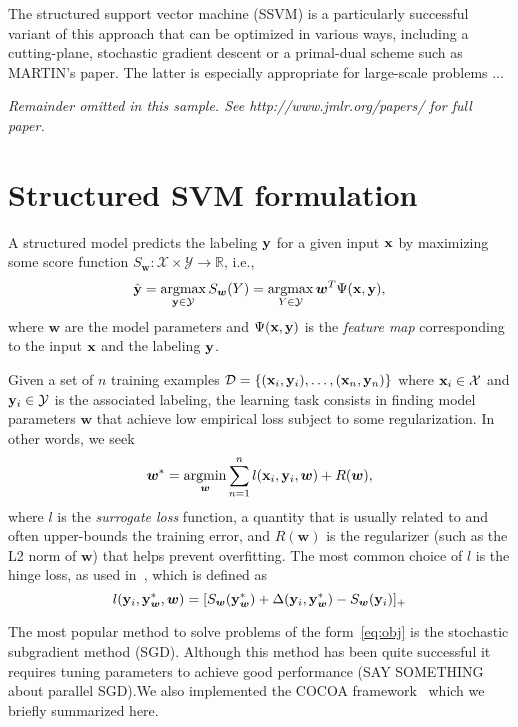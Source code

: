 \documentclass[twoside,11pt]{article}
\newcommand{\dataset}{{\cal D}}
\newcommand{\xv}{{\bf x}}
\newcommand{\yv}{{\bf y}}
\newcommand{\argmax}{\operatornamewithlimits{argmax}}
\newcommand{\argmin}{\operatornamewithlimits{argmin}}
\newcommand{\0}{\mathbf{0}} %
\newcommand{\weight}{w}
\newcommand{\wv}{{\bm{\weight}}}
\begin{document}
The structured support vector machine (SSVM) is a particularly successful variant of this approach that can be optimized in various ways, including a cutting-plane, stochastic gradient descent or a primal-dual scheme such as MARTIN's paper. The latter is especially appropriate for large-scale problems ...

{\noindent \em Remainder omitted in this sample. See http://www.jmlr.org/papers/ for full paper.}

\section{Structured SVM formulation}

A structured model predicts the labeling $\yv$ for a given input $\xv$ by maximizing some score function
$S_\wv:\mathcal{X} \times \mathcal{Y} \rightarrow \mathbb{R}$,
i.e.,
%
\begin{equation}
\label{eq:inference}
\hat{\yv} = \argmax_{\yv \in \mathcal{Y}} S_\wv(Y) = \argmax_{Y \in \mathcal{Y}} \wv^T\Psi(\xv,\yv),
\end{equation}
%
where $\wv$ are the model parameters and $\Psi(\xv,\yv)$ is the \emph{feature map} corresponding to the input $\xv$ and the labeling $\yv$.


Given a set of $n$ training examples $\dataset=\{(\xv_i,\yv_i), \dots, (\xv_n, \yv_n)\}$ where $\xv_i \in \mathcal{X}$ and $\yv_i \in \mathcal{Y}$ is the associated labeling, 
the learning task consists in finding model parameters $\wv$ that achieve low empirical loss subject to some regularization. In other words, we seek
%
\begin{align}
\label{eq:obj}
\wv^* = \argmin_{\wv} \sum_{n=1}^n l(\xv_i, \yv_i, \wv) + R(\wv),
\end{align}
%
where $l$ is the \emph{surrogate loss} function,
a quantity that is usually related to and often upper-bounds the training error, 
and $R(\wv)$ is the regularizer (such as the L2 norm of $\wv$)
that helps prevent overfitting. 
The most common choice of $l$ is the hinge loss, as used in~\cite{Taskar:2003tt,Tsochantaridis:2005ww}, which is defined as
\begin{equation}
\label{eq:hinge-loss}
l(\yv_i, \yv^*_\wv, \wv) = [S_\wv(\yv^*_\wv) + \Delta(\yv_i, \yv^*_\wv) - S_\wv(\yv_i)]_+
\end{equation}


The most popular method to solve problems of the form~\eqref{eq:obj}
is the stochastic subgradient method (SGD). Although this method has
been quite successful it requires tuning parameters to achieve good
performance (SAY SOMETHING about parallel SGD).We also implemented the
COCOA framework~\cite{Jaggi:2014vi} which we briefly summarized here.
\end{document}

